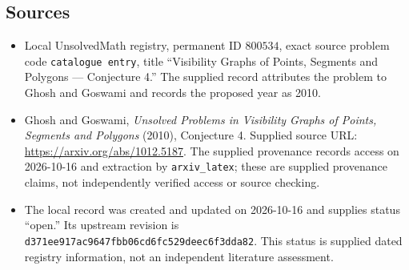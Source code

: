 \documentclass[11pt]{article}
\begin{document}
\subsection{Sources}
\begin{itemize}
\item Local UnsolvedMath registry, permanent ID \(800534\), exact source problem code \texttt{catalogue entry}, title ``Visibility Graphs of Points, Segments and Polygons --- Conjecture 4.'' The supplied record attributes the problem to Ghosh and Goswami and records the proposed year as 2010.
\item Ghosh and Goswami, \emph{Unsolved Problems in Visibility Graphs of Points, Segments and Polygons} (2010), Conjecture 4. Supplied source URL: \url{https://arxiv.org/abs/1012.5187}. The supplied provenance records access on 2026-10-16 and extraction by \texttt{arxiv\_latex}; these are supplied provenance claims, not independently verified access or source checking.
\item The local record was created and updated on 2026-10-16 and supplies status ``open.'' Its upstream revision is \texttt{d371ee917ac9647fbb06cd6fc529deec6f3dda82}. This status is supplied dated registry information, not an independent literature assessment.
\end{itemize}
\end{document}
